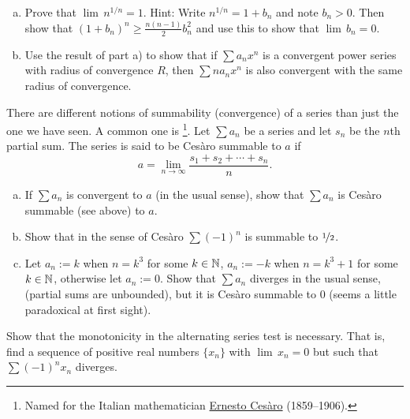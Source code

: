 \begin{samepage}
\begin{exercise}
\leavevmode
\begin{enumerate}[a)]
\item
Prove that $\lim \, n^{1/n} = 1$.  Hint:  Write $n^{1/n} = 1+b_n$ and
note $b_n > 0$.  Then show that ${(1+b_n)}^n \geq 
\frac{n(n-1)}{2}b_n^2$ and use this to show that $\lim \, b_n = 0$.
\item
Use the result of part a) to show that
if $\sum a_n x^n$ is a convergent power series with radius of convergence $R$,
then $\sum n a_n x^n$ is also convergent with the same radius of convergence.
\end{enumerate}
\end{exercise}
\end{samepage}

\begin{exnote}
There are different notions of summability (convergence)
of a series
than just the one we have seen.
A common one is \emph{}%
\footnote{Named for the Italian mathematician
\href{https://en.wikipedia.org/wiki/Ernesto_Ces\%C3\%A0ro}{Ernesto Ces\`aro}
(1859--1906).}.  Let $\sum a_n$ be a series
and let $s_n$ be the $n$th partial sum.  The series is said to
be Ces\`aro summable to $a$ if
\begin{equation*}
a = \lim_{n\to \infty} \frac{s_1 + s_2 + \cdots + s_n}{n} .
\end{equation*}
\end{exnote}

\begin{exercise}[Challenging]
\leavevmode
\begin{enumerate}[a)]
\item
If $\sum a_n$ is convergent to $a$ (in the usual sense), show that
$\sum a_n$ is Ces\`aro summable (see above) to $a$.
\item
Show that in the sense of Ces\`aro $\sum {(-1)}^n$ is summable to
$\nicefrac{1}{2}$.
\item
Let $a_n := k$ when $n = k^3$ for some $k \in {\mathbb{N}}$,
$a_n := -k$ when $n = k^3+1$ for some $k \in {\mathbb{N}}$,
otherwise
let $a_n := 0$.  Show that $\sum a_n$ diverges in the usual sense,
(partial sums are unbounded), but it is
Ces\`aro summable to 0 (seems a little paradoxical at first sight).
\end{enumerate}
\end{exercise}

\begin{exercise}[Challenging]
Show that the monotonicity in the alternating series test
is necessary.  That is, find a sequence of positive real numbers
$\{ x_n \}$ with $\lim\, x_n = 0$ but such that
$\sum {(-1)}^n x_n$ diverges.
\end{exercise}

